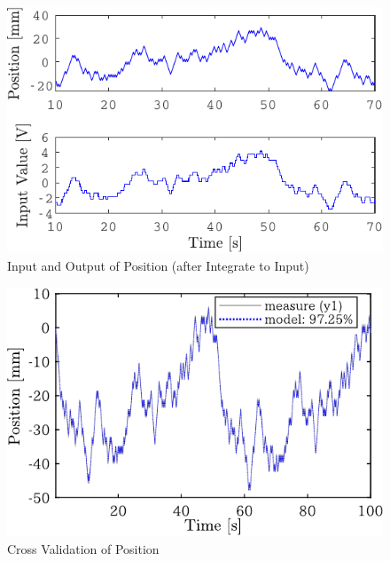 \begin{figure}[t]
    \centering
        \includegraphics[keepaspectratio, scale=1.0]{contents/SystemIdentification/figure/crop-inputANDpos_sekibun.pdf}
        \caption{Input and Output of Position (after Integrate to Input)}
        \label{fig:crop-inputANDpos_sekibun}
\end{figure}
\begin{figure}[t]
    \centering
        \includegraphics[keepaspectratio, scale=1.0]{contents/SystemIdentification/figure/crop-pos_compare_mseq.pdf}
        \caption{Cross Validation of Position}
        \label{fig:crop-pos_compare_mseq}
\end{figure}



































